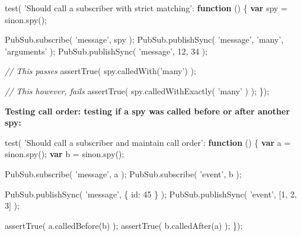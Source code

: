\documentclass[9pt]{book}
\newenvironment{Shaded}{}{}
\newcommand{\KeywordTok}[1]{\textcolor[rgb]{0.00,0.44,0.13}{\textbf{{#1}}}}
\newcommand{\DataTypeTok}[1]{\textcolor[rgb]{0.56,0.13,0.00}{{#1}}}
\newcommand{\DecValTok}[1]{\textcolor[rgb]{0.25,0.63,0.44}{{#1}}}
\newcommand{\StringTok}[1]{\textcolor[rgb]{0.25,0.44,0.63}{{#1}}}
\newcommand{\CommentTok}[1]{\textcolor[rgb]{0.38,0.63,0.69}{\textit{{#1}}}}
\newcommand{\OtherTok}[1]{\textcolor[rgb]{0.00,0.44,0.13}{{#1}}}
\newcommand{\FunctionTok}[1]{\textcolor[rgb]{0.02,0.16,0.49}{{#1}}}
\newcommand{\NormalTok}[1]{{#1}}
\begin{document}
\begin{Shaded}
\begin{Highlighting}[]
\FunctionTok{test}\NormalTok{( }\StringTok{'Should call a subscriber with strict matching'}\NormalTok{: }\KeywordTok{function} \NormalTok{() \{}
    \KeywordTok{var} \NormalTok{spy = }\OtherTok{sinon}\NormalTok{.}\FunctionTok{spy}\NormalTok{();}

    \OtherTok{PubSub}\NormalTok{.}\FunctionTok{subscribe}\NormalTok{( }\StringTok{'message'}\NormalTok{, spy );}
    \OtherTok{PubSub}\NormalTok{.}\FunctionTok{publishSync}\NormalTok{( }\StringTok{'message'}\NormalTok{, }\StringTok{'many'}\NormalTok{, }\StringTok{'arguments'} \NormalTok{);}
    \OtherTok{PubSub}\NormalTok{.}\FunctionTok{publishSync}\NormalTok{( }\StringTok{'message'}\NormalTok{, }\DecValTok{12}\NormalTok{, }\DecValTok{34} \NormalTok{);}

    \CommentTok{// This passes}
    \FunctionTok{assertTrue}\NormalTok{( }\OtherTok{spy}\NormalTok{.}\FunctionTok{calledWith}\NormalTok{(}\StringTok{'many'}\NormalTok{) );}

    \CommentTok{// This however, fails}
    \FunctionTok{assertTrue}\NormalTok{( }\OtherTok{spy}\NormalTok{.}\FunctionTok{calledWithExactly}\NormalTok{( }\StringTok{'many'} \NormalTok{) );}
\NormalTok{\});}
\end{Highlighting}
\end{Shaded}

\textbf{Testing call order: testing if a spy was called before or after
another spy:}

\begin{Shaded}
\begin{Highlighting}[]
\FunctionTok{test}\NormalTok{( }\StringTok{'Should call a subscriber and maintain call order'}\NormalTok{: }\KeywordTok{function} \NormalTok{() \{}
    \KeywordTok{var} \NormalTok{a = }\OtherTok{sinon}\NormalTok{.}\FunctionTok{spy}\NormalTok{();}
    \KeywordTok{var} \NormalTok{b = }\OtherTok{sinon}\NormalTok{.}\FunctionTok{spy}\NormalTok{();}

    \OtherTok{PubSub}\NormalTok{.}\FunctionTok{subscribe}\NormalTok{( }\StringTok{'message'}\NormalTok{, a );}
    \OtherTok{PubSub}\NormalTok{.}\FunctionTok{subscribe}\NormalTok{( }\StringTok{'event'}\NormalTok{, b );}

    \OtherTok{PubSub}\NormalTok{.}\FunctionTok{publishSync}\NormalTok{( }\StringTok{'message'}\NormalTok{, \{ }\DataTypeTok{id}\NormalTok{: }\DecValTok{45} \NormalTok{\} );}
    \OtherTok{PubSub}\NormalTok{.}\FunctionTok{publishSync}\NormalTok{( }\StringTok{'event'}\NormalTok{, [}\DecValTok{1}\NormalTok{, }\DecValTok{2}\NormalTok{, }\DecValTok{3}\NormalTok{] );}

    \FunctionTok{assertTrue}\NormalTok{( }\OtherTok{a}\NormalTok{.}\FunctionTok{calledBefore}\NormalTok{(b) );}
    \FunctionTok{assertTrue}\NormalTok{( }\OtherTok{b}\NormalTok{.}\FunctionTok{calledAfter}\NormalTok{(a) );}
\NormalTok{\});}
\end{Highlighting}
\end{Shaded}
\end{document}
